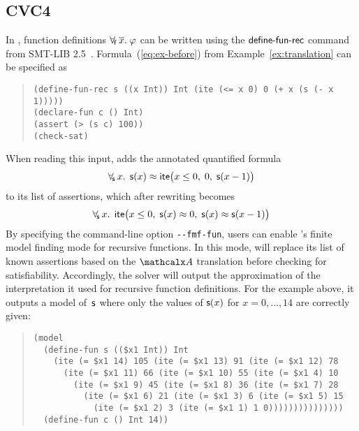 
\subsection{CVC4}
\label{ssec:cvc4}


In \cvc, function definitions $\forall_{\!\mathsf{f}\:} \overline{x}.\; \varphi$ can be written using the $\mathsf{define}\text{-}\mathsf{fun}\text{-}\mathsf{rec}$ command
from SMT-LIB 2.5~\cite{smtlib25}.
Formula~(\ref{eq:ex-before}) from Example~\ref{ex:translation}
can be specified as %
%
\begin{quote}
\verb|(define-fun-rec s ((x Int)) Int (ite (<= x 0) 0 (+ x (s (- x 1)))))|\kern-200mm \\
\verb|(declare-fun c () Int)| \\
\verb|(assert (> (s c) 100))| \\
\verb|(check-sat)|
\end{quote}
%
When reading this input,
\cvc adds the annotated quantified formula
$$\forall_{\!\mathsf{s}\:} x.\;\, \mathsf{s}( x ) \approx \mathsf{ite}\bigl( x \leq 0,\; 0,\; \mathsf{s}( x-1 )\bigr)$$
to its list of assertions,
which after rewriting becomes
$$\forall_{\!\mathsf{s}\:} x.\;\, \mathsf{ite}\bigl( x \leq 0,\; \mathsf{s}( x ) \approx 0,\; \mathsf{s}( x ) \approx \mathsf{s}( x-1 ) \bigr)$$
By specifying the command-line option \texttt{-}\texttt{-fmf-fun}, users
can enable \cvc's finite model finding mode for recursive functions.
In this mode, \cvc will replace its list of known
assertions based on the $\conv$ translation before checking for satisfiability.
Accordingly, the solver will output the approximation of the interpretation it
used for recursive function definitions.
For the example above, it outputs a %
model of~$\mathsf{s}$ where only
the values of $\mathsf{s}(x)$ for $x = 0,\dotsc,14$ are correctly given:
\begin{quote}
\begin{verbatim}
(model
  (define-fun s (($x1 Int)) Int
    (ite (= $x1 14) 105 (ite (= $x1 13) 91 (ite (= $x1 12) 78
      (ite (= $x1 11) 66 (ite (= $x1 10) 55 (ite (= $x1 4) 10
        (ite (= $x1 9) 45 (ite (= $x1 8) 36 (ite (= $x1 7) 28
          (ite (= $x1 6) 21 (ite (= $x1 3) 6 (ite (= $x1 5) 15
            (ite (= $x1 2) 3 (ite (= $x1 1) 1 0)))))))))))))))
  (define-fun c () Int 14))
\end{verbatim}
\end{quote}

